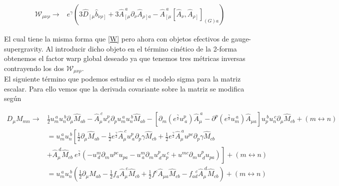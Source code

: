 \documentclass{article}
\numberwithin{equation}{section}
\begin{document}
\begin{boxeq}
	\begin{equation}
	\begin{aligned}
	\mathcal{W}_{\mu \nu \rho} \longrightarrow& e^{\gamma} \left( 3\hat{D}_{\left[ \mu \right.} \hat{b}_{\left. \nu \rho \right]} + 3 \hat{A}_{\left[ \mu\right.}^{\ a} \partial_{\nu} \hat{A}_{\left. \rho \right] a } - \hat{A}_{\left[ \mu \right.}^{\ a} \left[\hat{A}_{\nu}, \hat{A}_{\left.\rho\right]} \right]_{(G) a} \right)
	\end{aligned}
	\end{equation}
\end{boxeq}

El cual tiene la misma forma que \ref{W} pero ahora con objetos efectivos de gauge-supergravity. Al introducir dicho objeto en el término cinético de la 2-forma obtenemos el factor warp global deseado ya que tenemos tres métricas inversas contrayendo los dos $ \mathcal{W}_{\mu \nu \rho} $.\\


El siguiente término que podemos estudiar es el modelo sigma para la matriz escalar. Para ello vemos que la derivada covariante sobre la matriz se modifica según

\begin{equation}
\begin{aligned}
D_{\mu} M_{m n} \longrightarrow& \frac{1}{2} u_{m}^{ \ a} u_{n}^{ \ b} \partial_{\mu} \hat{M}_{a b} - \hat{A}_{\mu}^{\ c} u^{p}_{ \ c} \partial_p u_{m}^{ \ a} u_{n}^{ \ b} \hat{M}_{a b} - \left[ \partial_m \left( e^{\frac{\gamma}{2}} u^{p}_{ \ a} \right) \hat{A}_{\mu}^{\ a} - \partial^p  \left( e^{\frac{\gamma}{2}} u_{m}^{ \ a} \right) \hat{A}_{\mu a} \right] u_{p}^{ \ b} u_{n}^{ \ c} \partial_{\mu} \hat{M}_{c b} + \left(m \leftrightarrow n\right)\\
&= u_{m}^{ \ a} u_{n}^{ \ b} \left[ \frac{1}{2}\partial_{\mu} \hat{M}_{a b} - \frac{1}{2} e^{\frac{\gamma}{2}}  \hat{A}_{\mu}^{\ c} u^{p}_{ \ a} \partial_p \gamma \hat{M}_{c b} + \frac{1}{2} e^{\frac{\gamma}{2}} \hat{A}_{\mu}^{\ a} u^{p c} \partial_p \gamma \hat{M}_{c b} \right.\\
&\left. + \hat{A}_{\mu}^{\ d} \hat{M}_{c b} \ e^{\frac{\gamma}{2}} \left( - u^{m}_{ \ d} \partial_m u^{p c} u_{p a} - u^{m}_{ \ a} \partial_m u^{p}_{ \ d} u_{p}^{\ c} + u^{m c} \partial_m u^{p}_{ \ d} u_{p a}\right) \right] + \left(m \leftrightarrow n\right)\\
&=  u_{m}^{ \ a} u_{n}^{ \ b} \left( \frac{1}{2}\partial_{\mu} \hat{M}_{a b} - \frac{1}{2} f_a \hat{A}_{\mu}^{\ c} \hat{M}_{c b} + \frac{1}{2} f^c \hat{A}_{\mu a} \hat{M}_{c b} - f_{a d}^{\ \ \  c} \hat{A}_{\mu}^{\ d} \hat{M}_{c b} \right) + \left(m \leftrightarrow n\right)
\end{aligned}
\end{equation}
\end{document}
